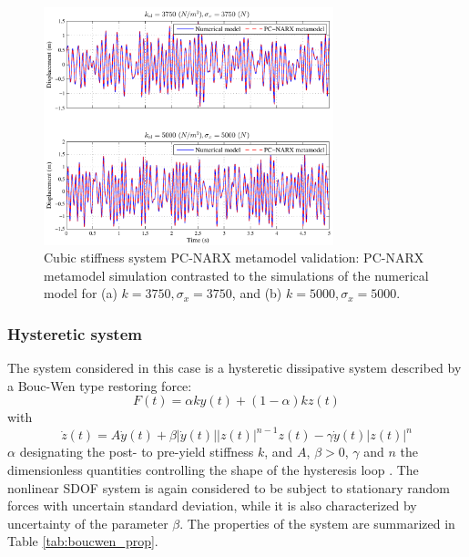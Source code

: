 \documentclass[preprint,3p,review,times,11pt]{elsarticle}
\newcommand{\beq}{\begin{equation}}
\newcommand{\eeq}{\end{equation}}
\begin{document}
\begin{figure}[t!]
\begin{center}
\includegraphics[width = 0.75\textwidth]{figs/cubic_randexci_val.pdf}
\caption{Cubic stiffness system PC-NARX metamodel validation: PC-NARX metamodel simulation contrasted to the simulations of the numerical model for (a) $k=3750,\sigma_x = 3750$, and (b) $k = 5000,\sigma_x = 5000$. 
\label{fig:cubic_validation}}
\end{center}
\end{figure}






\subsubsection{Hysteretic system}

The system considered in this case is a hysteretic dissipative system described by a Bouc-Wen type restoring force: 
%
\beq F(t) = \alpha k {y}(t) + (1-\alpha)k {z}(t) \eeq
%
with \beq \dot{z}(t) = A \dot{y}(t) + \beta |\dot{y}(t)| | z(t)|^{n-1} z(t) - \gamma\dot{y}(t) | z(t)|^{n}  \eeq
%
$\alpha$ designating the post- to pre-yield stiffness $k$, and $A$, $\beta>0$, $\gamma$ and $n$ the dimensionless quantities controlling the shape of the hysteresis loop \cite{Ismail-etal2009}. The nonlinear SDOF system is again considered to be subject to stationary random forces with uncertain standard deviation, while it is also characterized by uncertainty of the parameter $\beta$. The properties of the system are summarized in Table \ref{tab:boucwen_prop}.   
\end{document}
